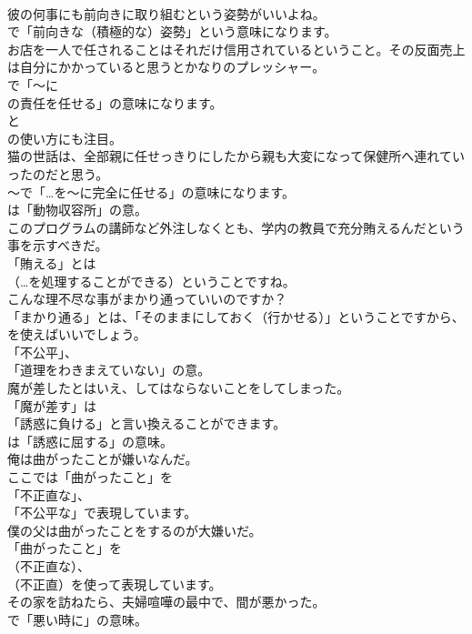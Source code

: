 \documentclass[8pt]{extreport}
\begin{document}
\begin{CJK}{UTF8}{min}
\\	彼の何事にも前向きに取り組むという姿勢がいいよね。 
\\	で「前向きな（積極的な）姿勢」という意味になります。	
\\	お店を一人で任されることはそれだけ信用されているということ。その反面売上は自分にかかっていると思うとかなりのプレッシャー。 
\\	で「～に 
\\	の責任を任せる」の意味になります。
\\	と 
\\	の使い方にも注目。	
\\	猫の世話は、全部親に任せっきりにしたから親も大変になって保健所へ連れていったのだと思う。 
\\	～で「…を～に完全に任せる」の意味になります。
\\	は「動物収容所」の意。	
\\	このプログラムの講師など外注しなくとも、学内の教員で充分賄えるんだという事を示すべきだ。 
\\	「賄える」とは
\\	（…を処理することができる）ということですね。	
\\	こんな理不尽な事がまかり通っていいのですか？ 
\\	「まかり通る」とは、「そのままにしておく（行かせる）」ということですから、
\\	を使えばいいでしょう。
\\	「不公平」、
\\	「道理をわきまえていない」の意。	
\\	魔が差したとはいえ、してはならないことをしてしまった。 
\\	「魔が差す」は
\\	「誘惑に負ける」と言い換えることができます。
\\	は「誘惑に屈する」の意味。	
\\	俺は曲がったことが嫌いなんだ。 
\\	ここでは「曲がったこと」を
\\	「不正直な」、
\\	「不公平な」で表現しています。	
\\	僕の父は曲がったことをするのが大嫌いだ。 
\\	「曲がったこと」を 
\\	（不正直な）、
\\	（不正直）を使って表現しています。	
\\	その家を訪ねたら、夫婦喧嘩の最中で、間が悪かった。 
\\	で「悪い時に」の意味。

\end{CJK}
\end{document}
